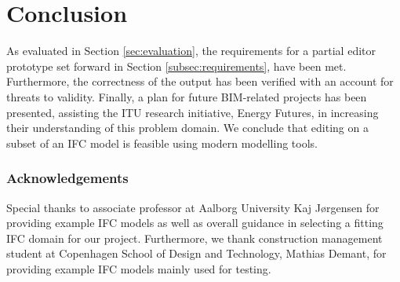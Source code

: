 \section{Conclusion}
\label{sec:conclusion}
As evaluated in Section \ref{sec:evaluation}, the requirements for a partial editor prototype set forward in Section \ref{subsec:requirements}, have been met. Furthermore, the correctness of the output has been verified with an account for threats to validity. Finally, a plan for future BIM-related projects has been presented, assisting the ITU research initiative, Energy Futures, in increasing their understanding of this problem domain. We conclude that editing on a subset of an IFC model is feasible using modern modelling tools.

\subsubsection{Acknowledgements} Special thanks to associate professor at Aalborg University Kaj Jørgensen for providing example IFC models as well as overall guidance in selecting a fitting IFC domain for our project. Furthermore, we thank construction management student at Copenhagen School of Design and Technology, Mathias Demant, for providing example IFC models mainly used for testing.